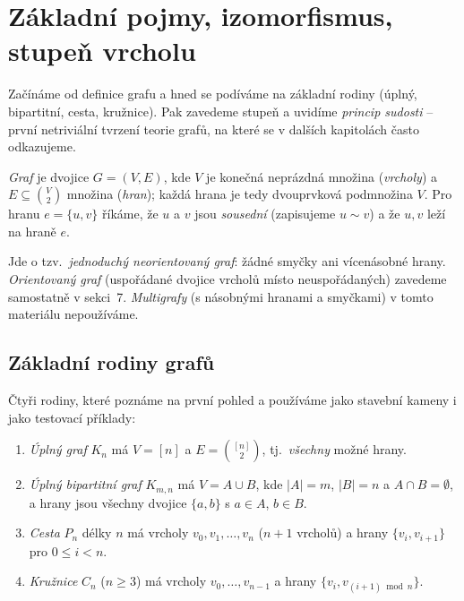 \documentclass[11pt,a4paper]{article}
\begin{document}
\section{Základní pojmy, izomorfismus, stupeň vrcholu}

Začínáme od definice grafu a hned se podíváme na základní rodiny (úplný, bipartitní, cesta, kružnice). Pak zavedeme stupeň a uvidíme \emph{princip sudosti} -- první netriviální tvrzení teorie grafů, na které se v dalších kapitolách často odkazujeme.


\begin{definice}[Graf]
\emph{Graf} je dvojice $G=(V,E)$, kde $V$ je konečná neprázdná množina (\emph{vrcholy}) a $E\subseteq\binom{V}{2}$ množina (\emph{hran}); každá hrana je tedy dvouprvková podmnožina $V$. Pro hranu $e=\{u,v\}$ říkáme, že $u$ a $v$ jsou \emph{sousední} (zapisujeme $u\sim v$) a že $u,v$ leží na hraně $e$.
\end{definice}

\begin{poznamka}
Jde o tzv.\ \emph{jednoduchý neorientovaný graf}: žádné smyčky ani vícenásobné hrany. \emph{Orientovaný graf} (uspořádané dvojice vrcholů místo neuspořádaných) zavedeme samostatně v sekci~7. \emph{Multigrafy} (s násobnými hranami a smyčkami) v tomto materiálu nepoužíváme.
\end{poznamka}

\subsection{Základní rodiny grafů}

Čtyři rodiny, které poznáme na první pohled a používáme jako stavební kameny i jako testovací příklady:

\begin{definice}\leavevmode
\begin{enumerate}[label=(\arabic*)]
  \item \emph{Úplný graf} $K_n$ má $V=[n]$ a $E=\binom{[n]}{2}$, tj.\ \emph{všechny} možné hrany.
  \item \emph{Úplný bipartitní graf} $K_{m,n}$ má $V=A\cup B$, kde $|A|=m$, $|B|=n$ a $A\cap B=\emptyset$, a hrany jsou všechny dvojice $\{a,b\}$ s $a\in A$, $b\in B$.
  \item \emph{Cesta} $P_n$ délky $n$ má vrcholy $v_0,v_1,\dots,v_n$ ($n+1$ vrcholů) a hrany $\{v_i,v_{i+1}\}$ pro $0\le i<n$.
  \item \emph{Kružnice} $C_n$ ($n\ge 3$) má vrcholy $v_0,\dots,v_{n-1}$ a hrany $\{v_i,v_{(i+1)\bmod n}\}$.
\end{enumerate}
\end{definice}
\end{document}
